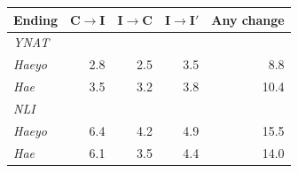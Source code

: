 \begin{tabular}{lrrrr}
\toprule
Ending & C$\to$I & I$\to$C & I$\to$I$'$ & Any change \\
\midrule
\multicolumn{5}{l}{\textit{YNAT}} \\
\textit{Haeyo} & 2.8 & 2.5 & 3.5 & 8.8 \\
\textit{Hae} & 3.5 & 3.2 & 3.8 & 10.4 \\
\multicolumn{5}{l}{\textit{NLI}} \\
\textit{Haeyo} & 6.4 & 4.2 & 4.9 & 15.5 \\
\textit{Hae} & 6.1 & 3.5 & 4.4 & 14.0 \\
\bottomrule
\end{tabular}
